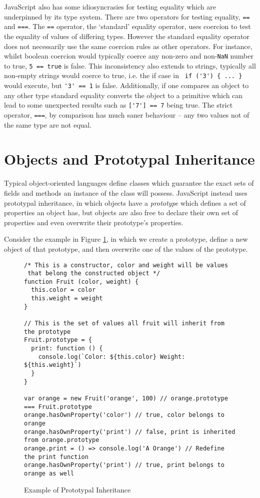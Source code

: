 \documentclass[]{final_report}
\begin{document}
JavaScript also has some idiosyncrasies for testing equality which are underpinned by its type system. There are two operators for testing equality, \lstinline|==| and \lstinline|===|. The \lstinline|==| operator, the `standard' equality operator, uses coercion to test the equality of values of differing types. However the standard equality operator does not necessarily use the same coercion rules as other operators. For instance, whilst boolean coercion would typically coerce any non-zero and non-\lstinline{NaN} number to true, \lstinline{5 == true} is false. This inconsistency also extends to strings, typically all non-empty strings would coerce to true, i.e. the if case in \lstinline| if ('3') { ... }| would execute, but \lstinline|'3' == 1| is false. Additionally, if one compares an object to any other type standard equality converts the object to a primitive which can lead to some unexpected results such as \lstinline|['7'] == 7|  being true. The strict operator, \lstinline|===|, by comparison has much saner behaviour -- any two values not of the same type are not equal.

\section{Objects and Prototypal Inheritance}
Typical object-oriented languages define classes which guarantee the exact sets of fields and methods an instance of the class will possess. JavaScript instead uses prototypal inheritance, in which objects have a \textit{prototype} which defines  a set of properties an object has, but objects are also free to declare their own set of properties and even overwrite their prototype's properties. 

Consider the example in Figure \ref{fig:js-prototypical-inheritance}, in which we create a prototype, define a new object of that prototype, and then overwrite one of the values of the prototype.

\begin{figure}[t]
\begin{lstlisting}
/* This is a constructor, color and weight will be values
 that belong the constructed object */
function Fruit (color, weight) {
  this.color = color
  this.weight = weight
}

// This is the set of values all fruit will inherit from the prototype
Fruit.prototype = {
  print: function () {
    console.log(`Color: ${this.color} Weight: ${this.weight}`)
  }
}

var orange = new Fruit('orange', 100) // orange.prototype === Fruit.prototype
orange.hasOwnProperty('color') // true, color belongs to orange
orange.hasOwnProperty('print') // false, print is inherited from orange.prototype
orange.print = () => console.log('A Orange') // Redefine the print function
orange.hasOwnProperty('print') // true, print belongs to orange as well
\end{lstlisting}
\caption{\label{fig:js-prototypical-inheritance} Example of Prototypal Inheritance}
\end{figure} 
\end{document}
